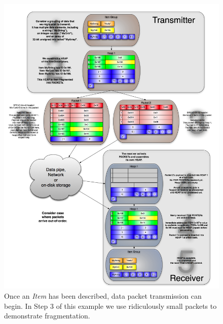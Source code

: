 \documentclass[11pt,english,twoside]{article}
\begin{document}
\begin{figure}[htbp]
   \centering
   \includegraphics[width=15cm]{images/Spead_itemdescriptor_data2}
   \caption[Example data exchange]{\small Once an \emph{Item} has been described, data packet transmission can begin. In Step 3 of this example
we use ridiculously small packets to demonstrate fragmentation.}
   \label{fig:example_item_desc_exchange}
\end{figure}
\end{document}
